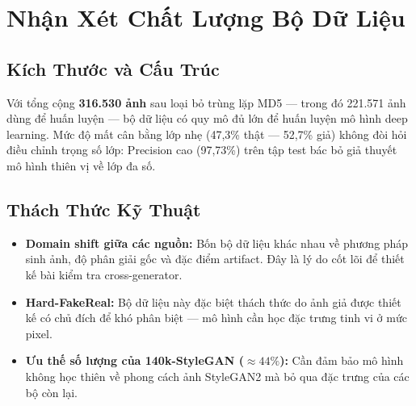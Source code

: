 \section{Nhận Xét Chất Lượng Bộ Dữ Liệu}

\subsection{Kích Thước và Cấu Trúc}

Với tổng cộng \textbf{316.530 ảnh} sau loại bỏ trùng lặp MD5 --- trong đó 221.571 ảnh dùng để huấn luyện --- bộ dữ liệu có quy mô đủ lớn để huấn luyện mô hình deep learning. Mức độ mất cân bằng lớp nhẹ (47,3\% thật --- 52,7\% giả) không đòi hỏi điều chỉnh trọng số lớp: Precision cao (97,73\%) trên tập test bác bỏ giả thuyết mô hình thiên vị về lớp đa số.

\subsection{Thách Thức Kỹ Thuật}

\begin{itemize}
  \item \textbf{Domain shift giữa các nguồn:} Bốn bộ dữ liệu khác nhau về phương pháp sinh ảnh, độ phân giải gốc và đặc điểm artifact. Đây là lý do cốt lõi để thiết kế bài kiểm tra cross-generator.

  \item \textbf{Hard-FakeReal:} Bộ dữ liệu này đặc biệt thách thức do ảnh giả được thiết kế có chủ đích để khó phân biệt --- mô hình cần học đặc trưng tinh vi ở mức pixel.

  \item \textbf{Ưu thế số lượng của 140k-StyleGAN ($\approx 44\%$):} Cần đảm bảo mô hình không học thiên về phong cách ảnh StyleGAN2 mà bỏ qua đặc trưng của các bộ còn lại.
\end{itemize}
